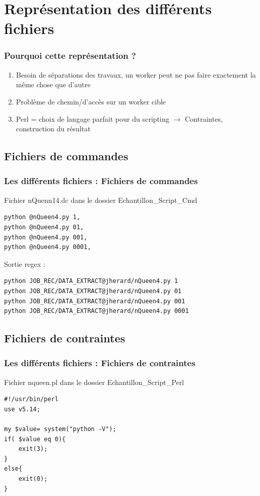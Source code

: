 \documentclass[slidetop,11pt]{beamer}
\begin{document}
\section[Représentation des différents fichiers]{Représentation des différents fichiers}
\begin{frame}[label=diff_fichiers,fragile]
\frametitle{Pourquoi cette représentation ?}
\begin{enumerate}
\item Besoin de séparations des travaux, un worker peut ne pas faire exactement la même chose que d'autre
\item Problème de chemin/d'accès sur un worker cible 
\item Perl = choix de langage parfait pour du scripting \newline $\rightarrow$ Contraintes, construction du résultat
\end{enumerate}

\end{frame}

\subsection[Fichiers de commandes]{Fichiers de commandes}
\begin{frame}[label=commandes,fragile]
\frametitle{Les différents fichiers : Fichiers de commandes}
Fichier nQuenn14.dc dans le dossier Echantillon\_Script\_Cmd 
\begin{verbatim}
python @nQueen4.py 1,
python @nQueen4.py 01,
python @nQueen4.py 001,
python @nQueen4.py 0001,
\end{verbatim}
\begin{block}{Sortie regex :}
\begin{verbatim}
python JOB_REC/DATA_EXTRACT@jherard/nQueen4.py 1
python JOB_REC/DATA_EXTRACT@jherard/nQueen4.py 01
python JOB_REC/DATA_EXTRACT@jherard/nQueen4.py 001
python JOB_REC/DATA_EXTRACT@jherard/nQueen4.py 0001
\end{verbatim}
\end{block}
\end{frame}

\subsection[Fichiers de contraintes]{Fichiers de contraintes}
\begin{frame}[label=contraintes,fragile]
\frametitle{Les différents fichiers : Fichiers de contraintes}

Fichier nqueen.pl dans le dossier Echantillon\_Script\_Perl 
\begin{verbatim}
#!/usr/bin/perl
use v5.14;

my $value= system("python -V");
if( $value eq 0){
    exit(3);
}
else{
    exit(0);
}
\end{verbatim}
\end{frame}
\end{document}
